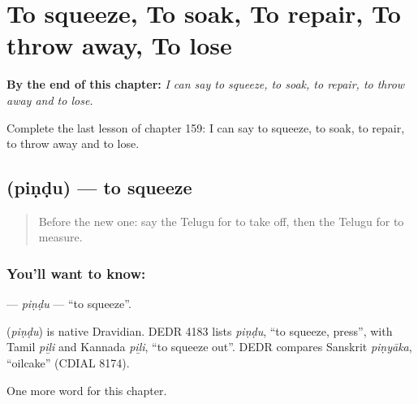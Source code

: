 
\chapter{To squeeze, To soak, To repair, To throw away, To lose}
\label{ch:te-to-squeeze-to-soak-to-repair-to-throw-away-to-lose}

\begin{chapteropening}
\textbf{By the end of this chapter:} \emph{I can say to squeeze, to soak, to repair, to throw away and to lose.}

Complete the last lesson of chapter 159: I can say to squeeze, to soak, to repair, to throw away and to lose.
\end{chapteropening}

\section[\texorpdfstring{\te{పిండు} (piṇḍu)}{పిండు (piṇḍu)}]{ (piṇḍu) — to squeeze}

\label{lesson:TE-C159-pindu}



\begin{quote}
Before the new one: say the Telugu for to take off, then the Telugu for to measure.
\end{quote}

\subsection*{You'll want to know: }
\textbf{} — \emph{piṇḍu} — \textquotedblleft{}to squeeze\textquotedblright{}.

\begin{cousinweb}
\textbf{} (\emph{piṇḍu}) is native Dravidian. DEDR 4183 lists \emph{piṇḍu}, \textquotedblleft{}to squeeze, press\textquotedblright{}, with Tamil \emph{piḻi} and Kannada \emph{piḻi}, \textquotedblleft{}to squeeze out\textquotedblright{}. DEDR compares Sanskrit \emph{piṇyāka}, \textquotedblleft{}oilcake\textquotedblright{} (CDIAL 8174).
\end{cousinweb}

\begin{grammarlens}[title={What you've built}]
One more word for this chapter.
\end{grammarlens}


